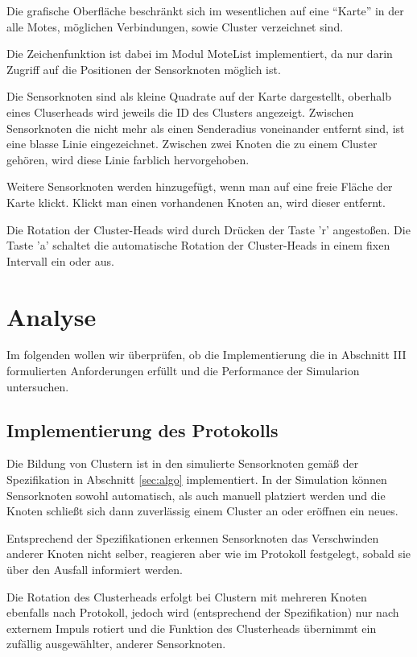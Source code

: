 Die grafische Oberfläche beschränkt sich im wesentlichen auf eine
``Karte'' in der alle Motes, möglichen Verbindungen, sowie Cluster
verzeichnet sind.

Die Zeichenfunktion ist dabei im Modul MoteList implementiert, da nur
darin Zugriff auf die Positionen der Sensorknoten möglich ist.

Die Sensorknoten sind als kleine Quadrate auf der Karte dargestellt,
oberhalb eines Cluserheads wird jeweils die ID des Clusters angezeigt.
Zwischen Sensorknoten die nicht mehr als einen Senderadius voneinander
entfernt sind, ist eine blasse Linie eingezeichnet. Zwischen zwei Knoten
die zu einem Cluster gehören, wird diese Linie farblich hervorgehoben.

Weitere Sensorknoten werden hinzugefügt, wenn man auf eine freie Fläche
der Karte klickt. Klickt man einen vorhandenen Knoten an, wird dieser
entfernt.

Die Rotation der Cluster-Heads wird durch Drücken der Taste 'r'
angestoßen. Die Taste 'a' schaltet die automatische Rotation der
Cluster-Heads in einem fixen Intervall ein oder aus.

\section{Analyse} \label{sec:ana}

Im folgenden wollen wir überprüfen, ob die Implementierung die in
Abschnitt III formulierten Anforderungen erfüllt und die Performance der
Simularion untersuchen.

\subsection{Implementierung des Protokolls}

Die Bildung von Clustern ist in den simulierte Sensorknoten gemäß der
Spezifikation in Abschnitt \ref{sec:algo} implementiert. In der Simulation können
Sensorknoten sowohl automatisch, als auch manuell platziert werden und
die Knoten schließt sich dann zuverlässig einem Cluster an oder eröffnen
ein neues.

Entsprechend der Spezifikationen erkennen Sensorknoten das Verschwinden
anderer Knoten nicht selber, reagieren aber wie im Protokoll festgelegt,
sobald sie über den Ausfall informiert werden.

Die Rotation des Clusterheads erfolgt bei Clustern mit mehreren Knoten
ebenfalls nach Protokoll, jedoch wird (entsprechend der Spezifikation)
nur nach externem Impuls rotiert und die Funktion des Clusterheads
übernimmt ein zufällig ausgewählter, anderer Sensorknoten.

